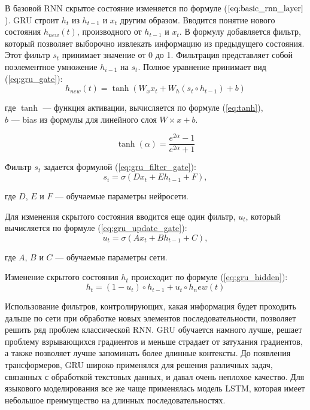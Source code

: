 В базовой RNN скрытое состояние изменяется по формуле ($\ref{eq:basic_rnn_layer}$). GRU строит $h_t$ из $h_{t-1}$ и $x_t$ другим образом. Вводится понятие нового состояния $h_{new}(t)$, производного от $h_{t-1}$ и $x_t$. В формулу добавляется фильтр, который позволяет выборочно извлекать информацию из предыдущего состояния. Этот фильтр $s_t$ принимает значение от 0 до 1. Фильтрация представляет собой поэлементное  умножение $h_{i-1}$ на $s_t$. Полное уравнение принимает вид (\ref{eq:gru_gate}):
\begin{equation}
	h_{new}(t) = \tanh{(W_xx_t + W_h(s_t \circ h_{t-1}) + b)}
	\label{eq:gru_gate}
\end{equation}
\begin{explanation}
	где $\tanh$ --- функция активации, вычисляется по формуле (\ref{eq:tanh}), \\
	$b$ --- bias из формулы для линейного слоя $W \times x + b$.
\end{explanation}
\begin{equation}
	\tanh{(\alpha)} = \frac{e^{2\alpha} - 1}{e^{2\alpha} + 1}
	\label{eq:tanh}
\end{equation}

Фильтр $s_t$ задается формулой (\ref{eq:gru_filter_gate}):
\begin{equation}
	s_i = \sigma(Dx_t + Eh_{t-1} + F),
	\label{eq:gru_filter_gate}
\end{equation}
\begin{explanation}
	где $D$, $E$ и $F$ --- обучаемые параметры нейросети.
\end{explanation}

Для изменения скрытого состояния вводится еще один фильтр, $u_t$, который вычисляется по формуле (\ref{eq:gru_update_gate}):
\begin{equation}
	u_t = \sigma(Ax_t + Bh_{t-1} + C),
	\label{eq:gru_update_gate}
\end{equation}
\begin{explanation}
	где $A$, $B$ и $C$ --- обучаемые параметры сети.
\end{explanation}

Изменение скрытого состояния $h_t$ происходит по формуле (\ref{eq:gru_hidden}):
\begin{equation}
	h_t = (1 - u_t) \circ h_{t-1} + u_t \circ h_new(t)
	\label{eq:gru_hidden}
\end{equation}

Использование фильтров, контролирующих, какая информация будет проходить дальше по сети при обработке новых элементов последовательности, позволяет решить ряд проблем классической RNN. GRU обучается намного лучше, решает проблему взрывающихся градиентов и меньше страдает от затухания градиентов, а также позволяет лучше запоминать более длинные контексты. До появления трансформеров, GRU широко применялся для решения различных задач, связанных с обработкой текстовых данных, и давал очень неплохое качество. Для языкового моделирования все же чаще применялась модель LSTM, которая имеет небольшое преимущество на длинных последовательностях.

